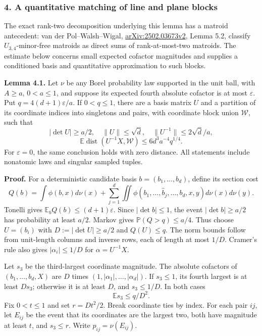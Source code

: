 \documentclass[
  11pt,
]{article}
\begin{document}
\subsubsection{4. A quantitative matching of line and plane
blocks}\label{a-quantitative-matching-of-line-and-plane-blocks}

The exact rank-two decomposition underlying this lemma has a matroid
antecedent: van der Pol--Walsh--Wigal,
\href{https://arxiv.org/html/2502.03673v2\#S5}{arXiv:2502.03673v2},
Lemma 5.2, classify \(U_{3,4}\)-minor-free matroids as direct sums of
rank-at-most-two matroids. The estimate below concerns small expected
cofactor magnitudes and supplies a conditioned basis and quantitative
approximation to such blocks.

\textbf{Lemma 4.1.} Let \(\nu\) be any Borel probability law supported
in the unit ball, with \(A\ge a\), \(0<a\le1\), and suppose its expected
fourth absolute cofactor is at most \(\varepsilon\). Put
\(q=4(d+1)\varepsilon/a\). If \(0<q\le1\), there are a basis matrix
\(U\) and a partition of its coordinate indices into singletons and
pairs, with coordinate block union \(\mathcal W\), such that \[
 |\det U|\ge a/2,\quad \|U\|\le\sqrt d,\quad
 \|U^{-1}\|\le2\sqrt d/a,
\] \[
 \mathbb E\operatorname{dist}(U^{-1}X,\mathcal W)
 \le6d^3a^{-4}q^{1/4}.                                       \tag{4.1}
\] For \(\varepsilon=0\), the same conclusion holds with zero distance.
All statements include nonatomic laws and singular sampled tuples.

\textbf{Proof.} For a deterministic candidate basis
\(b=(b_1,\ldots,b_d)\), define its section cost \[
 Q(b)=\int\phi(b,x)d\nu(x)
 +\sum_{j=1}^d\iint\phi(b_1,\ldots,\widehat b_j,\ldots,b_d,x,y)
                         d\nu(x)d\nu(y).
\] Tonelli gives \(\mathbb E_bQ(b)\le(d+1)\varepsilon\). Since
\(|\det b|\le1\), the event \(|\det b|\ge a/2\) has probability at least
\(a/2\). Markov gives \(\mathbb P(Q>q)\le a/4\). Thus choose \(U=(b_i)\)
with \(D:=|\det U|\ge a/2\) and \(Q(U)\le q\). The norm bounds follow
from unit-length columns and inverse rows, each of length at most
\(1/D\). Cramer's rule also gives \(|\alpha_i|\le1/D\) for
\(\alpha=U^{-1}X\).

Let \(s_3\) be the third-largest coordinate magnitude. The absolute
cofactors of \((b_1,\ldots,b_d,X)\) are \(D\) times
\((1,|\alpha_1|,\ldots,|\alpha_d|)\). If \(s_3\le1\), its fourth largest
is at least \(Ds_3\); otherwise it is at least \(D\), and \(s_3\le1/D\).
In both cases \[
 \mathbb E s_3\le q/D^2.                                      \tag{4.2}
\] Fix \(0<t\le1\) and set \(r=Dt^2/2\). Break coordinate ties by index.
For each pair \(ij\), let \(E_{ij}\) be the event that its coordinates
are the largest two, both have magnitude at least \(t\), and
\(s_3\le r\). Write \(p_{ij}=\nu(E_{ij})\).
\end{document}
